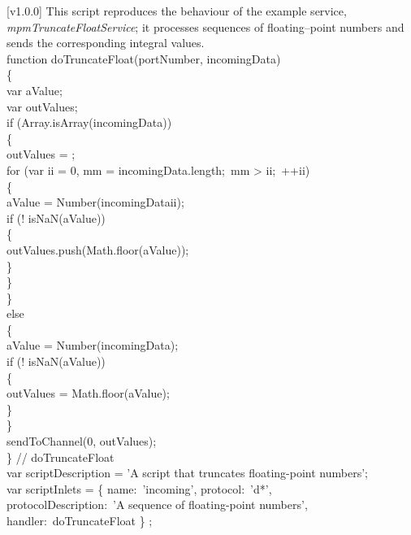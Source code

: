 [v1.0.0]
%
This script reproduces the behaviour of the example service,
\emph{mpmTruncateFloatService}; it processes sequences of floating--point numbers and
sends the corresponding integral values.\\

\codeBegin{}
function doTruncateFloat(portNumber, incomingData)\\
\{\\
\tS{}var aValue;\\
\tS{}var outValues;\\
    
\tS{}if (Array.isArray(incomingData))\\
\tS\{\\
\tS\tS{}outValues = \openSq{}\closeSq;\\
\tS\tS{}for (var ii = 0, mm = incomingData.length;\ mm > ii;\ ++ii)\\
\tS\tS\{\\
\tS\tS\tS{}aValue = Number(incomingData\openSq{}ii\closeSq);\\
\tS\tS\tS{}if (! isNaN(aValue))\\
\tS\tS\tS\{\\
\tS\tS\tS\tS{}outValues.push(Math.floor(aValue));\\
\tS\tS\tS\}\\
\tS\tS\}\\
\tS\}\\
\tS{}else\\
\tS\{\\
\tS\tS{}aValue = Number(incomingData);\\
\tS\tS{}if (! isNaN(aValue))\\
\tS\tS\{\\
\tS\tS\tS{}outValues = Math.floor(aValue);\\
\tS\tS\}\\
\tS\}\\
\tS{}sendToChannel(0, outValues);\\
\} // doTruncateFloat\\

var scriptDescription = 'A script that truncates floating-point numbers';\\

var scriptInlets = \openSq{} \{ name:\ 'incoming', protocol:\ 'd*',\\
\tS\tS\tS\tS\tS\tS\tS\tS\tS\tS{}protocolDescription:\
'A sequence of floating-point numbers',\\
\tS\tS\tS\tS\tS\tS\tS\tS\tS\tS{}handler:\ doTruncateFloat \} \closeSq;\\

